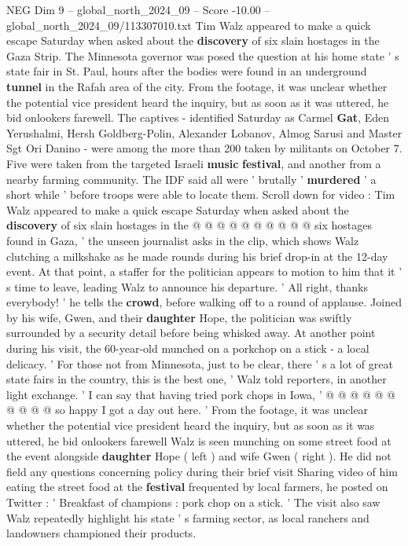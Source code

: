 \begin{textsample}{NEG Dim 9 – global\_north\_2024\_09 – Score -10.00 – global\_north\_2024\_09/113307010.txt}  \label{ex:f9_neg_020}
Tim Walz appeared to make a quick escape Saturday when asked about the \textbf{discovery} of six slain hostages in the Gaza Strip.
The Minnesota governor was posed the question at his home state ' s state fair in St.
Paul, hours after the bodies were found in an underground \textbf{tunnel} in the Rafah area of the city.
From the footage, it was unclear whether the potential vice president heard the inquiry, but as soon as it was uttered, he bid onlookers farewell.
The captives - identified Saturday as Carmel \textbf{Gat}, Eden Yerushalmi, Hersh Goldberg-Polin, Alexander Lobanov, Almog Sarusi and Master Sgt Ori Danino - were among the more than 200 taken by militants on October 7.
Five were taken from the targeted Israeli \textbf{music} \textbf{festival}, and another from a nearby farming community.
The IDF said all were ' brutally ' \textbf{murdered} ' a short while ' before troops were able to locate them.
Scroll down for video : Tim Walz appeared to make a quick escape Saturday when asked about the \textbf{discovery} of six slain hostages in the @ @ @ @ @ @ @ @ @ @ six hostages found in Gaza, ' the unseen journalist asks in the clip, which shows Walz clutching a milkshake as he made rounds during his brief drop-in at the 12-day event.
At that point, a staffer for the politician appears to motion to him that it ' s time to leave, leading Walz to announce his departure. ' All right, thanks everybody! ' he tells the \textbf{crowd}, before walking off to a round of applause.
Joined by his wife, Gwen, and their \textbf{daughter} Hope, the politician was swiftly surrounded by a security detail before being whisked away.
At another point during his visit, the 60-year-old munched on a porkchop on a stick - a local delicacy. ' For those not from Minnesota, just to be clear, there ' s a lot of great state fairs in the country, this is the best one, ' Walz told reporters, in another light exchange. ' I can say that having tried pork chops in Iowa, ' @ @ @ @ @ @ @ @ @ @ so happy I got a day out here. ' From the footage, it was unclear whether the potential vice president heard the inquiry, but as soon as it was uttered, he bid onlookers farewell Walz is seen munching on some street food at the event alongside \textbf{daughter} Hope ( left ) and wife Gwen ( right ).
He did not field any questions concerning policy during their brief visit Sharing video of him eating the street food at the \textbf{festival} frequented by local farmers, he posted on Twitter : ' Breakfast of champions : pork chop on a stick. ' The visit also saw Walz repeatedly highlight his state ' s farming sector, as local ranchers and landowners championed their products.

\end{textsample}
